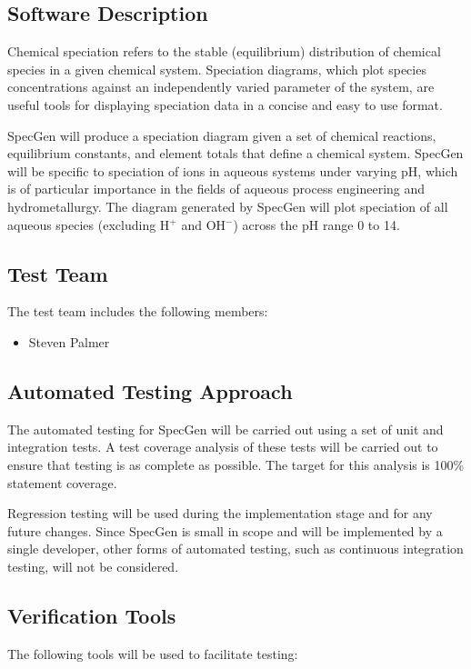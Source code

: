 \documentclass[12pt, titlepage]{article}
\newcommand{\progname}{SpecGen}
\begin{document}
\subsection{Software Description}
Chemical speciation refers to the stable (equilibrium) distribution of chemical 
species in a given chemical system.   Speciation diagrams, which plot species 
concentrations against an independently varied parameter of the system, are 
useful tools for displaying speciation data in a concise and easy to use format.  

\progname{} will produce a speciation diagram given a set of chemical reactions, 
equilibrium constants, and element totals that define a chemical system.  
\progname{} will be specific to speciation of ions in aqueous systems under 
varying pH, which is of particular importance in the fields of aqueous process 
engineering and hydrometallurgy.  The diagram generated by \progname{} will plot 
speciation of all aqueous species (excluding H$^+$ and OH$^-$) across the pH 
range 0 to 14.

\subsection{Test Team}
The test team includes the following members:
\begin{itemize}
\item Steven Palmer
\end{itemize}

\subsection{Automated Testing Approach}
The automated testing for \progname{} will be carried out using a set of unit 
and integration tests.  A test coverage analysis of these tests will be 
carried out to ensure that testing is as complete as possible.  The target 
for this analysis is 100\% statement coverage. 

Regression testing will be used during the implementation stage and for any 
future changes.  Since \progname{} is small in scope and will be implemented 
by a single developer, other forms of automated testing, such as continuous 
integration testing, will not be considered.


\subsection{Verification Tools}
The following tools will be used to facilitate testing:
\end{document}
